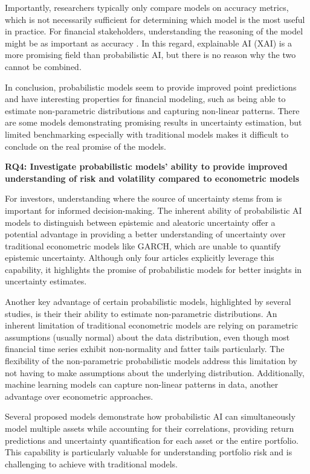 Importantly, researchers typically only compare models on accuracy metrics, which is not necessarily sufficient for determining which model is the most useful in practice. For financial stakeholders, understanding the reasoning of the model might be as important as accuracy \parencite{Freeborough2022}. In this regard, explainable AI (XAI) is a more promising field than probabilistic AI, but there is no reason why the two cannot be combined.

In conclusion, probabilistic models seem to provide improved point predictions and have interesting properties for financial modeling, such as being able to estimate non-parametric distributions and capturing non-linear patterns. There are some models demonstrating promising results in uncertainty estimation, but limited benchmarking especially with traditional models makes it difficult to conclude on the real promise of the models.


\textbf{RQ4: Investigate probabilistic models' ability to provide improved understanding of risk and volatility compared to econometric models}\nopagebreak

For investors, understanding where the source of uncertainty stems from is important for informed decision-making. The inherent ability of probabilistic AI models to distinguish between epistemic and aleatoric uncertainty offer a potential advantage in providing a better understanding of uncertainty over traditional econometric models like GARCH, which are unable to quantify epistemic uncertainty. Although only four articles explicitly leverage this capability, it highlights the promise of probabilistic models for better insights in uncertainty estimates.

Another key advantage of certain probabilistic models, highlighted by several studies, is their their ability to estimate non-parametric distributions. An inherent limitation of traditional econometric models are relying on parametric assumptions (usually normal) about the data distribution, even though most financial time series exhibit non-normality and fatter tails particularly. The flexibility of the non-parametric probabilistic models address this limitation by not having to make assumptions about the underlying distribution. Additionally, machine learning models can capture non-linear patterns in data, another advantage over econometric approaches.

Several proposed models demonstrate how probabilistic AI can simultaneously model multiple assets while accounting for their correlations, providing return predictions and uncertainty quantification for each asset or the entire portfolio. This capability is particularly valuable for understanding portfolio risk and is challenging to achieve with traditional models.

